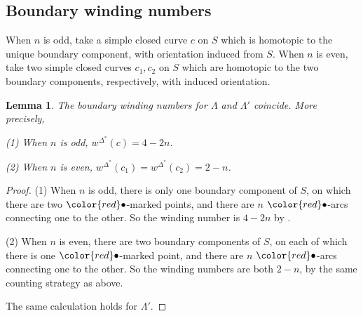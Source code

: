 \documentclass[11pt,reqno]{amsart}
\theoremstyle{plain}
\newtheorem{lemma}[theorem]{Lemma}
\theoremstyle{definition}
\theoremstyle{remark}
\numberwithin{equation}{section}
\begin{document}
\subsection{Boundary winding numbers}
\par When $n$ is odd, take a simple closed curve $c$ on $S$ which is homotopic to the unique boundary component, with orientation induced from $S$. When $n$ is even, take two simple closed curves $c_1,c_2$ on $S$ which are homotopic to the two boundary components, respectively, with induced orientation.
\begin{lemma}\label{lem:boundary winding number}
    The boundary winding numbers for $\Lambda$ and $\Lambda'$ coincide. More precisely,
    \par(1) When $n$ is odd, $w^{\Delta^*}(c)=4-2n$.
    \par(2) When $n$ is even, $w^{\Delta^*}(c_1)=w^{\Delta^*}(c_2)=2-n$.
\end{lemma}
\begin{proof}
    \par(1) When $n$ is odd, there is only one boundary component of $S$, on which there are two $\color{red}\bullet$-marked points, and there are $n$ $\color{red}\bullet$-arcs connecting one to the other. So the winding number is $4-2n$ by \cite[Lemma 3.18]{APS}.
    \par(2) When $n$ is even, there are two boundary components of $S$, on each of which there is one $\color{red}\bullet$-marked point, and there are $n$ $\color{red}\bullet$-arcs connecting one to the other. So the winding numbers are both $2-n$, by the same counting strategy as above.
    \par The same calculation holds for $\Lambda'$.
\end{proof}
\end{document}
